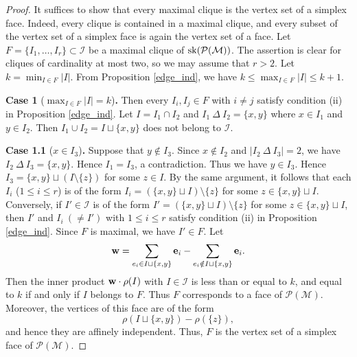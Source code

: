 \documentclass[12pt]{amsart}
\theoremstyle{definition}
\numberwithin{thm}{section}
\numberwithin{equation}{section}
\def\eb{{\mathbf e}}
\begin{document}
\begin{proof}
It suffices to show that every maximal clique is the vertex set of a simplex face. Indeed, every clique is contained in a maximal clique, and every subset of the vertex set of a simplex face is again the vertex set of a face. 
Let $F =\{I_1, \dots, I_r\} \subset {\mathcal I}$ be a maximal clique of ${\rm sk}({\mathcal P}({\mathcal M}))$.
The assertion is clear for cliques of cardinality at most two, so we may assume that \(r>2\).
Let $k= \min_{I \in F} |I|$.
From Proposition \ref{edge_ind}, we have
$k \le \max_{I \in F} |I| \le k+1 .$

\bigskip

\noindent
{\bf Case 1} ($\max_{I \in F} |I|=k$){\bf .}
Then every $I_i , I_j \in F$ with $i \ne j$ satisfy condition (ii) in Proposition \ref{edge_ind}.
Let $I = I_1 \cap I_2$ and $I_1 \ \Delta\  I_2 = \{x,y\}$
where $x \in I_1$ and $y \in I_2$.
Then $I_1 \cup I_2 = I \sqcup  \{x,y\}$ does not belong to ${\mathcal I}$.

\bigskip

\noindent
{\bf Case 1.1} ($x \in I_3$){\bf .}
Suppose that $y \notin I_3$.
Since $x \notin I_2$ and $|I_2 \ \Delta\  I_3| =2$, we have
$I_2 \ \Delta\  I_3 = \{x,y\}$.
Hence $I_1 = I_3$, a contradiction.
Thus we have $y \in I_3$.
Hence $I_3 = \{x,y\} \sqcup ( I \setminus \{z\})$
for some $z \in I$.
By the same argument, it follows that each $I_i$ ($1 \le i \le r$) is of the form
$I_i = ( \{x,y\} \sqcup I) \setminus \{z\}$ for some $z \in \{x,y\} \sqcup I$.
Conversely, if $I' \in {\mathcal I}$ is of the form 
$I' = ( \{x,y\} \sqcup I) \setminus \{z\}$ for some $z \in \{x,y\} \sqcup I$, then $I'$ and $I_i \ (\ne I')$ with $1 \le i \le r$ satisfy condition (ii) in Proposition \ref{edge_ind}.
Since $F$ is maximal, we have $I' \in F$.
Let 
$${\bf w} = \sum_{e_i \in  I \sqcup  \{x,y\}} \eb_i - \sum_{e_i \notin  I \sqcup  \{x,y\}} \eb_i.$$
Then the inner product ${\bf w} \cdot \rho(I)$ with $I \in {\mathcal I}$
is less than or equal to $k$, 
and equal to $k$ if and only if $I$ belongs to $F$.
Thus $F$ corresponds to a face of ${\mathcal P}({\mathcal M})$.
Moreover, the vertices of this face are of the form \[ \rho(I\sqcup\{x,y\})- \rho(\{z\}), \] and hence they are affinely independent. Thus, \(F\) is the vertex set of a simplex face of 
${\mathcal P}({\mathcal M})$.

\bigskip


\end{proof}
\end{document}
